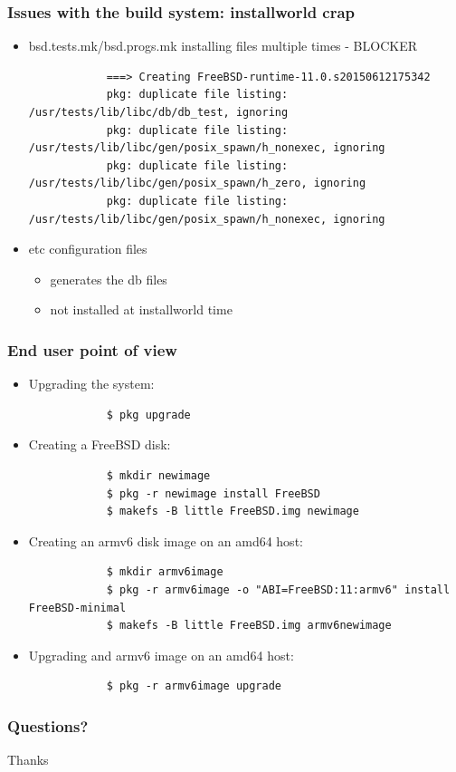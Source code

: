 \begin{frame}[fragile]
	\frametitle{Issues with the build system: installworld crap}
	\begin{itemize}
		\item bsd.tests.mk/bsd.progs.mk installing files multiple times - BLOCKER
			\begin{lstlisting}
			===> Creating FreeBSD-runtime-11.0.s20150612175342
			pkg: duplicate file listing: /usr/tests/lib/libc/db/db_test, ignoring
			pkg: duplicate file listing: /usr/tests/lib/libc/gen/posix_spawn/h_nonexec, ignoring
			pkg: duplicate file listing: /usr/tests/lib/libc/gen/posix_spawn/h_zero, ignoring
			pkg: duplicate file listing: /usr/tests/lib/libc/gen/posix_spawn/h_nonexec, ignoring
			\end{lstlisting}
		\item etc configuration files
			\begin{itemize}
				\item{generates the db files}
				\item{not installed at installworld time}
			\end{itemize}
	\end{itemize}
\end{frame}

\begin{frame}[fragile]
	\frametitle{End user point of view}
	\begin{itemize}
		\item Upgrading the system:
			\begin{lstlisting}
			$ pkg upgrade
			\end{lstlisting}
		\item Creating a FreeBSD disk:
			\begin{lstlisting}
			$ mkdir newimage
			$ pkg -r newimage install FreeBSD
			$ makefs -B little FreeBSD.img newimage
			\end{lstlisting}
		\item Creating an armv6 disk image on an amd64 host:
			\begin{lstlisting}
			$ mkdir armv6image
			$ pkg -r armv6image -o "ABI=FreeBSD:11:armv6" install FreeBSD-minimal
			$ makefs -B little FreeBSD.img armv6newimage
			\end{lstlisting}
		\item Upgrading and armv6 image on an amd64 host:
			\begin{lstlisting}
			$ pkg -r armv6image upgrade
			\end{lstlisting}
	\end{itemize}
\end{frame}

\begin{frame}
	\frametitle{Questions?}
	\center
	\Huge Thanks
\end{frame}

